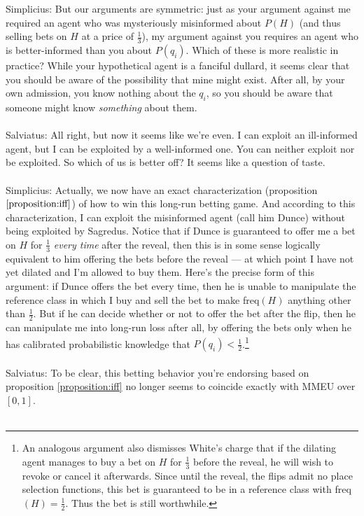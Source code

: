 \documentclass[letterpaper,12pt]{article}
\begin{document}
Simplicius: But our arguments are symmetric: just as your argument against me required an agent who was mysteriously misinformed about $P(H)$ (and thus selling bets on $H$ at a price of $\frac{1}{3}$), my argument against you requires an agent who is better-informed than you about $P(q_i)$. Which of these is more realistic in practice? While your hypothetical agent is a fanciful dullard, it seems clear that you should be aware of the possibility that mine might exist. After all, by your own admission, you know nothing about the $q_i$, so you should be aware that someone might know \emph{something} about them.\\ \\
Salviatus: All right, but now it seems like we're even. I can exploit an ill-informed agent, but I can be exploited by a well-informed one. You can neither exploit nor be exploited. So which of us is better off? It seems like a question of taste.\\ \\
Simplicius: Actually, we now have an exact characterization (proposition $\ref{proposition:iff}$) of how to win this long-run betting game. And according to this characterization, I can exploit the misinformed agent (call him Dunce) without being exploited by Sagredus. Notice that if Dunce is guaranteed to offer me a bet on $H$ for $\frac{1}{3}$ \emph{every time} after the reveal, then this is in some sense logically equivalent to him offering the bets before the reveal --- at which point I have not yet dilated and I'm allowed to buy them. Here's the precise form of this argument: if Dunce offers the bet every time, then he is unable to manipulate the reference class in which I buy and sell the bet to make freq$(H)$ anything other than $\frac{1}{2}$. But if he can decide whether or not to offer the bet after the flip, then he can manipulate me into long-run loss after all, by offering the bets only when he has calibrated probabilistic knowledge that $P(q_i) < \frac{1}{2}$.\footnote{An analogous argument also dismisses White's charge \citeyearpar[180]{White2009-WHIESA} that if the dilating agent manages to buy a bet on $H$ for $\frac{1}{3}$ before the reveal, he will wish to revoke or cancel it afterwards. Since until the reveal, the flips admit no place selection functions, this bet is guaranteed to be in a reference class with freq$(H) = \frac{1}{2}$. Thus the bet is still worthwhile.} \\ \\
Salviatus: To be clear, this betting behavior you're endorsing based on proposition \ref{proposition:iff} no longer seems to coincide exactly with MMEU over $[0, 1]$.\\ \\
\end{document}
